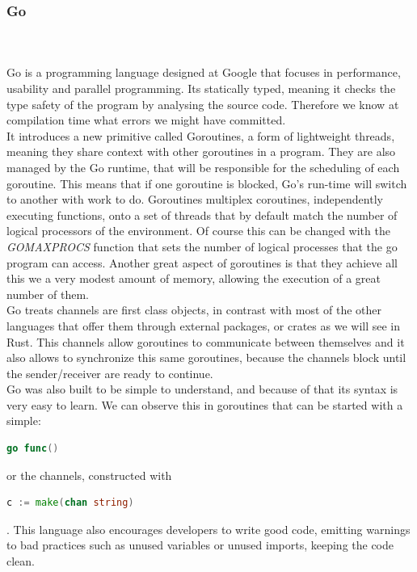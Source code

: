 \documentclass[runningheads]{llncs}
\begin{document}
\subsubsection{Go}\hfill\\\\
Go is a programming language designed at Google that focuses in performance, usability and parallel programming.
Its statically typed, meaning it checks the type safety of the program by analysing the source code. Therefore we know at compilation time what errors we might have committed.\\
It introduces a new primitive called Goroutines, a form of lightweight threads, meaning they share context with other goroutines in a program. They are also managed by the Go runtime, that will be responsible for the scheduling of each goroutine. This means that if one goroutine is blocked, Go's run-time will switch to another with work to do.
Goroutines multiplex coroutines, independently executing functions, onto a set of threads that by default match the number of logical processors of the environment. Of course this can be changed with the {\it GOMAXPROCS} function that sets the number of logical processes that the go program can access. Another great aspect of goroutines is that they achieve all this we a very modest amount of memory, allowing the execution of a great number of them.\\
Go treats channels are first class objects, in contrast with most of the other languages that offer them through external packages, or crates as we will see in Rust. This channels allow goroutines to communicate between themselves and it also allows to synchronize this same goroutines, because the channels block until the sender/receiver are ready to continue.\\	
Go was also built to be simple to understand, and because of that its syntax is very easy to learn. We can observe this in goroutines that can be started with a simple:
\begin{lstlisting}[language=Go]
go func()
\end{lstlisting} 
or the channels, constructed with
\begin{lstlisting}[language=Go]
c := make(chan string)
\end{lstlisting}.
This language also encourages developers to write good code, emitting warnings to bad practices such as unused variables or unused imports, keeping the code clean.
\end{document}
